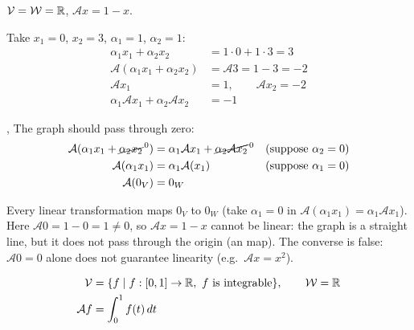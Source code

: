 \begin{example}
$\mathcal{V}=\mathcal{W}=\mathbb{R}$, \quad $\mathcal{A}x=1-x$.

\begin{center}
\end{center}

Take $x_1=0$, $x_2=3$, $\alpha_1=1$, $\alpha_2=1$:
\begin{align*}
\alpha_1x_1+\alpha_2x_2 &= 1\cdot 0+1\cdot 3=3\\
\mathcal{A}(\alpha_1x_1+\alpha_2x_2) &= \mathcal{A}3=1-3=-2\\
\mathcal{A}x_1 &= 1, \qquad \mathcal{A}x_2=-2\\
\alpha_1\mathcal{A}x_1+\alpha_2\mathcal{A}x_2 &= -1
\end{align*}

\sep
The graph should pass through zero: 
\begin{align*}
\mathcal{A}(\alpha_1x_1+\cancel{\alpha_2x_2}^{\,0}) &= \alpha_1\mathcal{A}x_1+\cancel{\alpha_2\mathcal{A}x_2}^{\,0}
  && \text{(suppose } \alpha_2=0)\\
\mathcal{A}(\alpha_1x_1) &= \alpha_1\mathcal{A}(x_1) && \text{(suppose } \alpha_1=0)\\
\mathcal{A}(0_V) &= 0_W
\end{align*}
\begin{insight}
Every linear transformation maps $0_V$ to $0_W$ (take $\alpha_1=0$ in $\mathcal{A}(\alpha_1x_1)=\alpha_1\mathcal{A}x_1$). Here $\mathcal{A}0=1-0=1\ne0$, so $\mathcal{A}x=1-x$ cannot be linear: the graph is a straight line, but it does not pass through the origin (an  map). The converse is false: $\mathcal{A}0=0$ alone does not guarantee linearity (e.g.\ $\mathcal{A}x=x^2$).
\end{insight}
\end{example}

\begin{example}\leavevmode{}
\begin{align*}
\mathcal{V} &= \{f \mid f:[0,1]\to\mathbb{R},\ f \text{ is integrable}\}, \qquad \mathcal{W} = \mathbb{R}\\
\mathcal{A}f &= \int_0^1 f(t)\,dt
\end{align*}
\end{example}

